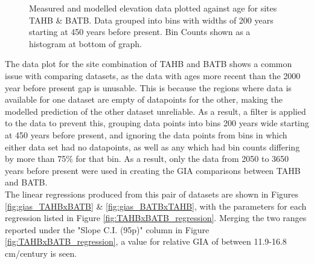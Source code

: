 \begin{figure}[H]
	\caption{Measured and modelled elevation data plotted against age for sites TAHB \& BATB. Data grouped into bins with widths of 200 years starting at 450 years before present. Bin Counts shown as a histogram at bottom of graph.}	
	\label{fig:data_TAHBxBATB}
\end{figure}

The data plot for the site combination of TAHB and BATB shows a common issue
with comparing datasets, as the data with ages more recent than the 2000 year before
present gap is unusable. This is because the regions where data is available for
one dataset are empty of datapoints for the other, making the modelled prediction
of the other dataset unreliable. As a result, a filter is applied to the
data to prevent this, grouping data points into bins 200 years wide starting at 450 years before present, and
ignoring the data points from bins in which either data set had no datapoints,
as well as any which had bin counts differing by more than 75\% for that bin.
As a result, only the data from 2050 to 3650 years before present were used in
creating the GIA comparisons between TAHB and BATB.\\
The linear regressions produced from this pair of datasets are shown in Figures 
\ref{fig:gias_TAHBxBATB} \& \ref{fig:gias_BATBxTAHB}, with the parameters for each
regression listed in Figure \ref{fig:TAHBxBATB_regression}. Merging the two ranges
reported under the "Slope C.I. (95p)" column in Figure \ref{fig:TAHBxBATB_regression},
a value for relative GIA of between 11.9-16.8 cm/century is seen. \\


